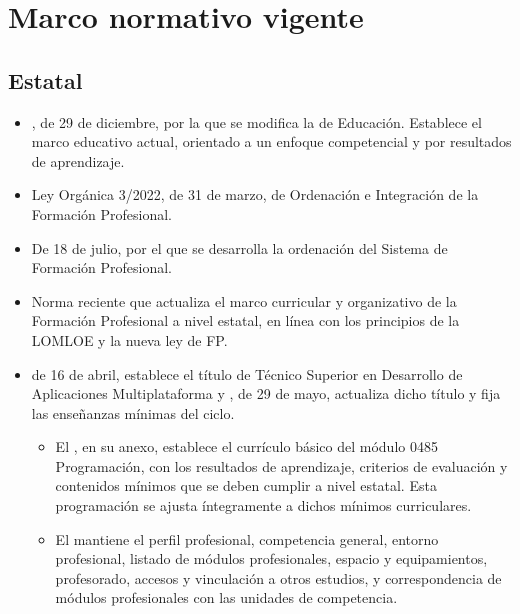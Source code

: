  
 \section*{Marco normativo vigente}
 \label{sec:marco-normativo}
 
 \subsection*{Estatal}
 \label{sec:normativa-estatal}

 \begin{itemize}
     \item \label{ley:lomloe_l}, de 29 de diciembre, por la que se modifica la \label{ley:loe_l} de Educación.  Establece el marco educativo actual, orientado a un enfoque competencial y por resultados de aprendizaje.
 
     \item \label{ley:nueva-fp_l} Ley Orgánica 3/2022, de 31 de marzo, de Ordenación e Integración de la Formación Profesional.
 
     \item \label{rd:659-2023_l} De 18 de julio, por el que se desarrolla la ordenación del Sistema de Formación Profesional.
 
     \item \label{rd:500-2024_l} Norma reciente que actualiza el marco curricular y organizativo de la Formación Profesional a nivel estatal, en línea con los principios de la LOMLOE y la nueva ley de FP.
 
     \item  \label{rd:450-2010_l} de 16 de abril, establece el título de Técnico Superior en Desarrollo de Aplicaciones Multiplataforma 
     y
     \label{rd:405-2023_l}, de 29 de mayo, actualiza dicho título y fija las enseñanzas mínimas del ciclo.
     \begin{itemize}
         \item El  , en su anexo, establece el currículo básico del módulo 0485 Programación, con los resultados de aprendizaje, criterios de evaluación y contenidos mínimos que se deben cumplir a nivel estatal. Esta programación se ajusta íntegramente a dichos mínimos curriculares.
         \item El  mantiene el perfil profesional, competencia general, entorno profesional, listado de módulos profesionales, espacio y equipamientos, profesorado, accesos y vinculación a otros estudios, y correspondencia de módulos profesionales con las unidades de competencia.
     \end{itemize}
 \end{itemize}
 

